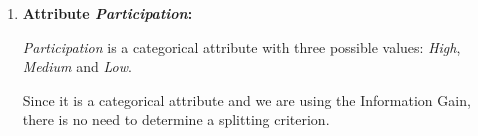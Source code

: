 \documentclass[
english,
smallborders
]{i6prcsht}
\begin{document}
\begin{solution}
\begin{enumerate}
\begin{enumerate}
\begin{enumerate}
\begin{alignat*}{2}
					                                                    & = 0,1910                                                                                                                                                                                                                                \\
				                  \end{alignat*}
				                  
				            \item \textbf{Attribute \textit{Participation}:}
				                  
				                  \textit{Participation} is a categorical attribute with three possible values: \textit{High}, \textit{Medium} and \textit{Low}.
				                  
				                  Since it is a categorical attribute and we are using the Information Gain, there is no need to determine a splitting criterion.
				                  

\end{enumerate}
\end{enumerate}
\end{enumerate}
\end{solution}
\end{document}
